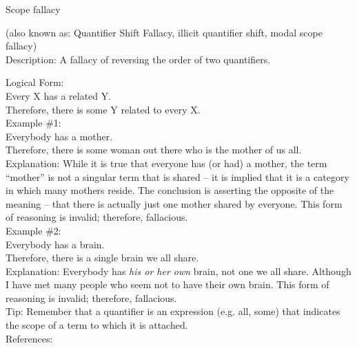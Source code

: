 \documentclass[a4paper,12pt,single,pdftex]{scrbook}
\begin{document}
Scope fallacy
    
      (also known as: Quantifier Shift Fallacy, illicit quantifier shift, modal scope fallacy)
    \\

  
    Description: A fallacy of reversing the order of two quantifiers.

    
      Logical Form:
    \\

    
      Every X has a related Y.
    \\

    
      Therefore, there is some Y related to every X.
    \\

    
      Example \#1:
    \\

    
      Everybody has a mother.
    \\

    
      Therefore, there is some woman out there who is the mother of us all.
    \\

    
      Explanation: While it is true that everyone has (or had) a mother, the term “mother” is not a singular term that is shared -- it is implied that it is a category in which many mothers reside.  The conclusion is asserting the opposite of the meaning -- that there is actually just one mother shared by everyone.  This form of reasoning is invalid; therefore, fallacious.
    \\

    
      Example \#2:
    \\

    
      Everybody has a brain.
    \\

    
      Therefore, there is a single brain we all share.
    \\

    
      Explanation: Everybody has {\it his or her own} brain, not one we all share.  Although I have met many people who seem not to have their own brain.  This form of reasoning is invalid; therefore, fallacious.
    \\

    
      Tip: Remember that a quantifier is an expression (e.g. all, some) that indicates the scope of a term to which it is attached.
    \\

    References:

    
      
\end{document}
